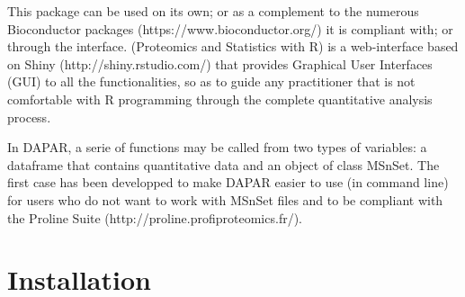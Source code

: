 \documentclass[12pt]{article}
\begin{document}
This package can be used on its own; or as a complement to the numerous Bioconductor packages (https://www.bioconductor.org/) it is compliant with; or through the  interface.
 (Proteomics and Statistics with R) is a web-interface based on Shiny (http://shiny.rstudio.com/) that provides Graphical User Interfaces (GUI) to all the  functionalities, so as to guide any practitioner that is not comfortable with R programming through the complete quantitative analysis process.


In DAPAR, a serie of functions may be called from two types of variables: a dataframe that contains quantitative data and an object of class MSnSet. The first case has been developped to make DAPAR easier to use (in command line) for users who do not want to work with MSnSet files and to be compliant with the Proline Suite (http://proline.profiproteomics.fr/).


\section{Installation}\label{sec:install}
\end{document}
